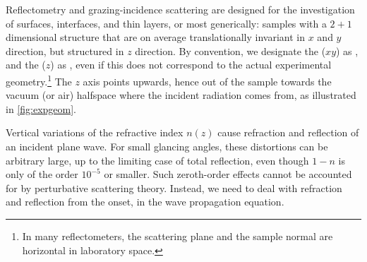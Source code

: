 Reflectometry and grazing-incidence scattering
are designed for the investigation of surfaces, interfaces, and thin layers,
or most generically:
samples with a $2+1$ dimensional structure
that are on average translationally invariant in $x$ and $y$ direction,
but structured in $z$ direction.
%
%
%
By convention,
we designate the  ($xy$) as ,
%
%
and the  ($z$) as ,
%
%
%
even if this does not correspond to the actual experimental geometry.\footnote
{In many reflectometers,
%
%
 the scattering plane and the sample normal are horizontal in laboratory space.}
The $z$ axis points upwards, hence out of the sample towards the
vacuum (or air) halfspace where the incident radiation comes from,
as illustrated in \cref{fig:expgeom}.

Vertical variations of the refractive index $n(z)$
%
cause refraction and reflection of an incident plane wave.
%
%
%
For small glancing angles,
these distortions can be arbitrary large,
up to the limiting case of total reflection,
even though $1-n$ is only of the order $10^{-5}$ or smaller.
Such zeroth-order effects cannot be accounted for
by perturbative scattering theory.
Instead, we need to deal with refraction and reflection
from the onset, in the wave propagation equation.

